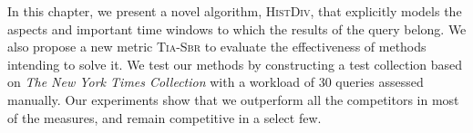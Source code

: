 In this chapter, we present a novel algorithm, \textsc{HistDiv}, that explicitly models the aspects and important time windows to which the results of the query belong. We also propose a new metric \textsc{Tia-Sbr} to evaluate the effectiveness of methods intending to solve it. We test our methods by constructing a test collection based on \emph{The New York Times Collection} with a workload of 30 queries assessed manually. Our experiments show that we outperform all the competitors in most of the measures, and remain competitive in a select few.




